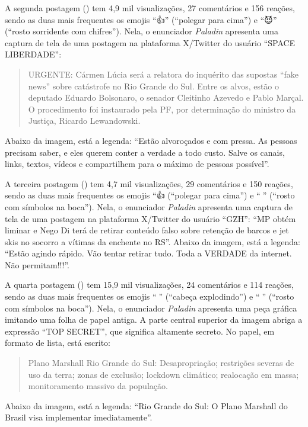 \documentclass[portuguese]{textolivre}
\begin{document}
A segunda postagem () tem 4,9 mil visualizações, 27 comentários e 156 reações, sendo as duas mais frequentes os emojis ``{\Symbola 👍}'' (``polegar para cima'') e ``{\Symbola 😈}'' (``rosto sorridente com chifres''). Nela, o enunciador \emph{Paladin} apresenta uma captura de tela de uma postagem na plataforma X/Twitter do usuário ``SPACE LIBERDADE'':

\begin{quote}
URGENTE: Cármen Lúcia será a relatora do inquérito das supostas ``fake news'' sobre catástrofe no Rio Grande do Sul. Entre os alvos, estão o deputado Eduardo Bolsonaro, o senador Cleitinho Azevedo e Pablo Marçal. O procedimento foi instaurado pela PF, por determinação do ministro da Justiça, Ricardo Lewandowski.
\end{quote}
Abaixo da imagem, está a legenda: ``Estão alvoroçados e com pressa. As pessoas precisam saber, e eles querem conter a verdade a todo custo. Salve os canais, links, textos, vídeos e compartilhem para o máximo de pessoas possível''.

A terceira postagem () tem 4,7 mil visualizações, 29 comentários e 150 reações, sendo as duas mais frequentes os emojis ``{\Symbola 👍} (``polegar para cima'') e ``{\Symbola 🤬}'' (``rosto com símbolos na boca''). Nela, o enunciador \emph{Paladin} apresenta uma captura de tela de uma postagem na plataforma X/Twitter do usuário ``GZH'': ``MP obtém liminar e Nego Di terá de retirar conteúdo falso sobre retenção de barcos e jet skis no socorro a vítimas da enchente no RS''. Abaixo da imagem, está a legenda: ``Estão agindo rápido. Vão tentar retirar tudo. Toda a VERDADE da internet. Não permitam!!!''.

A quarta postagem () tem 15,9 mil visualizações, 24 comentários e 114 reações, sendo as duas mais frequentes os emojis ``{\Symbola 🤯}'' (``cabeça explodindo'') e ``{\Symbola 🤬}'' (``rosto com símbolos na boca''). Nela, o enunciador \emph{Paladin} apresenta uma peça gráfica imitando uma folha de papel antiga. A parte central superior da imagem abriga a expressão ``TOP SECRET'', que significa altamente secreto. No papel, em formato de lista, está escrito:

\begin{quote}
Plano Marshall Rio Grande do Sul: Desapropriação; restrições severas de uso da terra; zonas de exclusão; lockdown climático; realocação em massa; monitoramento massivo da população.
\end{quote}

Abaixo da imagem, está a legenda: ``Rio Grande do Sul: O Plano Marshall do Brasil visa implementar imediatamente''.
\end{document}

